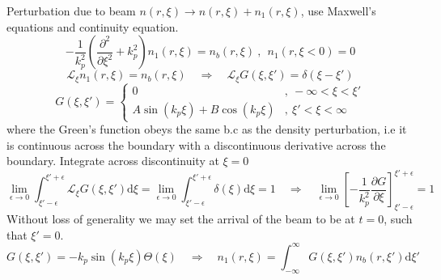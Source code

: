 Perturbation due to beam $n\left(r,\xi \right)\to n\left(r,\xi \right)+n_1\left(r,\xi \right)$, use Maxwell's equations and continuity equation.
\begin{equation}
-\frac{1}{k_p^2}\left(\frac{\partial^2 }{\partial \xi^2}+k_p^2\right)n_1\left(r,\xi \right)=n_b\left(r,\xi \right) ~,~~n_1\left(r,\xi<0 \right)=0
\end{equation}
\begin{equation}
\mathcal{L}_{\xi}n_1\left(r,\xi \right)=n_b\left(r,\xi \right) \quad \Rightarrow \quad \mathcal{L}_{\xi}G\left(\xi,\xi'\right)=\delta\left(\xi-\xi'\right)
\end{equation}
\begin{equation}
G\left(\xi,\xi'\right)=\left\{ \begin{array}{ll}
0 &,~ -\infty<\xi<\xi'\\
A\sin\left(k_p\xi \right) + B\cos\left(k_p\xi \right) &,~ \xi'<\xi<\infty
\end{array}\right.
\end{equation}
where the Green's function obeys the same b.c as the density perturbation, i.e it is continuous across the boundary with a discontinuous derivative across the boundary.
Integrate across discontinuity at $\xi=0$
\begin{equation}
\lim_{\epsilon\to 0}\int_{\xi'-\epsilon}^{\xi'+\epsilon} \mathcal{L}_{\xi}G\left(\xi,\xi'\right)\mathrm{d}\xi=\lim_{\epsilon\to 0}\int_{\xi'-\epsilon}^{\xi'+\epsilon}\delta\left(\xi\right)\mathrm{d}\xi=1 \quad \Rightarrow \quad \lim_{\epsilon\to 0}\left[-\frac{1}{k_p^2}\frac{\partial G}{\partial \xi}\right]^{\xi'+\epsilon}_{\xi'-\epsilon}=1
\end{equation}
Without loss of generality we may set the arrival of the beam to be at $t=0$, such that $\xi'=0$.
\begin{equation}
G\left(\xi,\xi'\right)=-k_p\sin\left(k_p\xi \right)\Theta\left(\xi \right) \quad \Rightarrow \quad n_1\left(r,\xi \right)=\int_{-\infty}^{\infty}G\left(\xi,\xi'\right)n_b\left(r,\xi' \right) \mathrm{d}\xi'
\end{equation}
